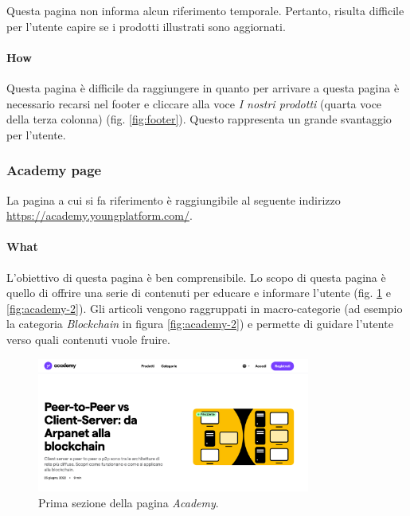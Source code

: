 Questa pagina non informa alcun riferimento temporale. Pertanto, risulta 
difficile per l'utente capire se i prodotti illustrati sono aggiornati.

\paragraph{How}

Questa pagina è difficile da raggiungere in quanto per arrivare a questa 
pagina è necessario recarsi nel footer e cliccare alla voce 
\textit{I nostri prodotti} (quarta voce della terza colonna) 
(fig. \ref{fig:footer}). Questo rappresenta un grande svantaggio per 
l'utente.

\subsubsection{Academy page}

La pagina a cui si fa riferimento è raggiungibile al seguente indirizzo 
\href{https://academy.youngplatform.com/}{https://academy.youngplatform.com/}.

\paragraph{What}

L'obiettivo di questa pagina è ben comprensibile. Lo scopo di questa 
pagina è quello di offrire una serie di contenuti per educare e informare 
l'utente (fig. \ref{fig:academy-1} e \ref{fig:academy-2}). Gli articoli 
vengono raggruppati in macro-categorie (ad esempio la categoria 
\textit{Blockchain} in figura \ref{fig:academy-2}) e permette di guidare 
l'utente verso quali contenuti vuole fruire. 

\begin{figure}[H]
  \centering
  \includegraphics[width=0.80\textwidth]{res/images/internal-pages/academy/academy-1.png}
  \caption{Prima sezione della pagina \textit{Academy}.}
  \label{fig:academy-1}
\end{figure}

